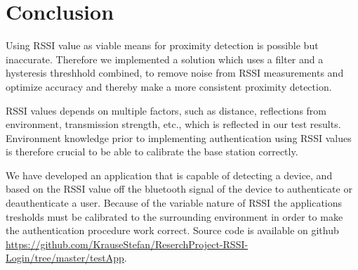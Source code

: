 \section{Conclusion}
Using RSSI value as viable means for proximity detection is possible but inaccurate. Therefore we implemented a solution which uses a filter and a hysteresis threshhold combined, to remove noise from RSSI measurements and optimize accuracy and thereby make a more consistent proximity detection.

RSSI values depends on multiple factors, such as distance, reflections from environment, transmission strength, etc., which is reflected in our test results. Environment knowledge prior to implementing authentication using RSSI values is therefore crucial to be able to calibrate the base station correctly.

We have developed an application that is capable of detecting a device, and based on the RSSI value off the bluetooth signal of the device to authenticate or deauthenticate a user. Because of the variable nature of RSSI the applications tresholds must be calibrated to the surrounding environment in order to make the authentication procedure work correct. Source code is available on github \url{https://github.com/KrauseStefan/ReserchProject-RSSI-Login/tree/master/testApp}.

%

